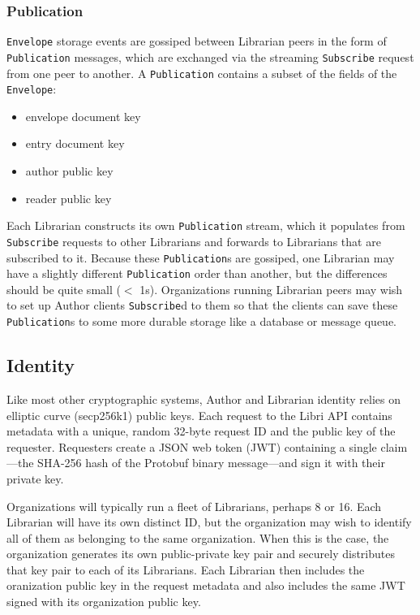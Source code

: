 \documentclass[10pt]{article}
\newcommand{\ttt}[1]{\texttt{#1}}
\def\Envelope{\ttt{Envelope}}
\def\Publication{\ttt{Publication}}
\begin{document}
\subsubsection{Publication}

\Envelope{} storage events are gossiped between Librarian peers in the form of \Publication{} messages, which are exchanged via the streaming \ttt{Subscribe} request from one peer to another. A \Publication{} contains a subset of the fields of the \Envelope{}:
\begin{itemize}
	\item envelope document key
	\item entry document key
	\item author public key
	\item reader public key
\end{itemize}

Each Librarian constructs its own \Publication{} stream, which it populates from \ttt{Subscribe} requests to other Librarians and forwards to Librarians that are subscribed to it. Because these \texttt{Publication}s are gossiped, one Librarian may have a slightly different \Publication{} order than another, but the differences should be quite small ($<$ 1s). Organizations running Librarian peers may wish to set up Author clients \ttt{Subscribe}d to them so that the clients can save these \Publication{}s to some more durable storage like a database or message queue. 

\subsection{Identity}
\label{sec:Identity}
Like most other cryptographic systems, Author and Librarian identity relies on elliptic curve (secp256k1) public keys. Each request to the Libri API contains metadata with a unique, random 32-byte request ID and the public key of the requester. Requesters create a JSON web token (JWT) containing a single claim---the SHA-256 hash of the Protobuf binary message---and sign it with their private key. 

Organizations will typically run a fleet of Librarians, perhaps 8 or 16. Each Librarian will have its own distinct ID, but the organization may wish to identify all of them as belonging to the same organization. When this is the case, the organization generates its own public-private key pair and securely distributes that key pair to each of its Librarians. Each Librarian then includes the oranization public key in the request metadata and also includes the same JWT signed with its organization public key.
\end{document}
